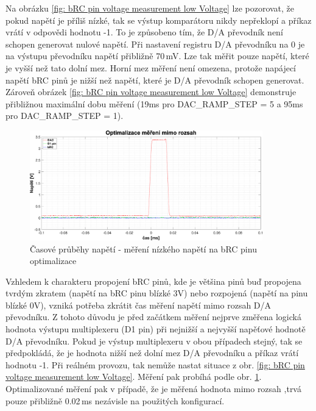 Na obrázku \ref{fig: bRC pin voltage measurement low Voltage} lze pozorovat, že pokud napětí je příliš nízké, tak se výstup komparátoru nikdy nepřeklopí a 
příkaz vrátí v odpovědi hodnotu -1.
To je způsobeno tím, že D/A převodník není schopen generovat nulové napětí. Při nastavení registru D/A převodníku na 0 je na výstupu převodníku napětí přibližně 70\,mV.
Lze tak měřit pouze napětí, které je vyšší než tato dolní mez. Horní mez měření není omezena, protože napájecí napětí bRC pinů je nižší než napětí,
které je D/A převodník schopen generovat. Zároveň obrázek \ref{fig: bRC pin voltage measurement low Voltage} demonstruje přibližnou maximální dobu
měření (19ms pro DAC\_RAMP\_STEP = 5 a 95ms pro DAC\_RAMP\_STEP = 1). \\

\begin{figure}[ht!]
    \centering
    \includegraphics[width = 0.9\textwidth]{obrazky/matlab_generated/pin_out_of_range_opt.eps}
    \caption{Časové průběhy napětí - měření nízkého napětí na bRC pinu optimalizace}
    \label{fig: bRC pin voltage measurement low Voltage opt}
\end{figure}


Vzhledem k charakteru propojení bRC pinů, kde je většina pinů buď propojena tvrdým zkratem (napětí na bRC pinu blízké 3V) nebo rozpojená (napětí na pinu blízké 0V),
vzniká potřeba zkrátit čas měření napětí mimo rozsah D/A převodníku. Z tohoto důvodu je před začátkem měření nejprve změřena logická hodnota výstupu multiplexeru (D1 pin) při
nejnižší a nejvyšší napěťové hodnotě D/A převodníku. Pokud je výstup multiplexeru v obou případech stejný, tak se předpokládá, že je hodnota nižší než dolní mez D/A převodníku
a příkaz vrátí hodnotu -1. Při reálném provozu, tak nemůže nastat situace z obr. \ref{fig: bRC pin voltage measurement low Voltage}.
Měření pak probíhá podle obr. \ref{fig: bRC pin voltage measurement low Voltage opt}. Optimalizované měření pak v případě, že je měřená hodnota mimo rozsah
,trvá pouze přibližně 0.02\,ms nezávisle na použitých konfigurací.\\


